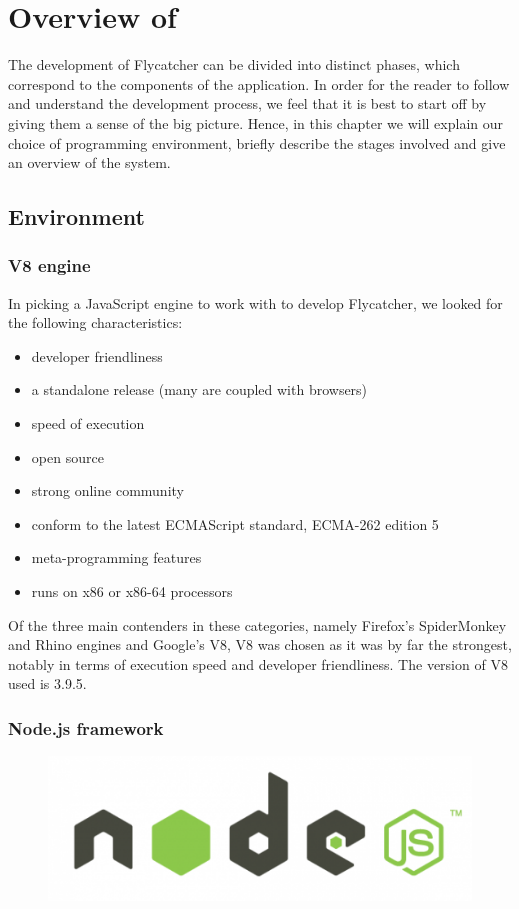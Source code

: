 \chapter{Overview of \textsf{}}
The development of Flycatcher can be divided into distinct phases, which correspond to the components of the application. In order for the reader to follow and understand the development process, we feel that it is best to start off by giving them a sense of the big picture. Hence, in this chapter we will explain our choice of programming environment, briefly describe the stages involved and give an overview of the system.

\section{Environment}
\subsection{V8 engine}

In picking a JavaScript engine to work with to develop \textsf{Flycatcher}, we looked for the following characteristics:
\begin{itemize}
   \item developer friendliness
   \item a standalone release (many are coupled with browsers)
   \item speed of execution
   \item open source
   \item strong online community
   \item conform to the latest ECMAScript standard, ECMA-262 edition 5
   \item meta-programming features
   \item runs on x86 or x86-64 processors
\end{itemize}

Of the three main contenders in these categories, namely Firefox's SpiderMonkey and Rhino engines and Google's V8, V8 was chosen as it was by far the strongest, notably in terms of execution speed and developer friendliness. The version of V8 used is 3.9.5.

\subsection{Node.js framework}
\begin{figure}[h]
\centering
\includegraphics[scale=0.2]{./components/chapter3/nodejs.png}
\end{figure}

